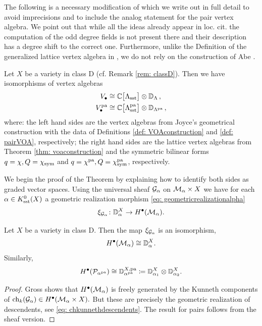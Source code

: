 \documentclass[a4paper, 12pt]{amsart}
\begin{document}
The following is a necessary modification of \cite[Theorem 5.7]{Gr19} which we write out in full detail to avoid imprecisions and to include the analog statement for the pair vertex algebra. We point out that while all the ideas already appear in loc. cit. the computation of the odd degree fields is not present there and their description has a degree shift to the correct one. Furthermore, unlike the Definition of the generalized lattice vertex algebra in \cite{Gr19}, we do not rely on the construction of Abe \cite{Abe07}.

\begin{theorem}\label{thm: gross}
Let $X$ be a variety in class D (cf. Remark \ref{rem: classD}).
Then we have isomorphisms of vertex algebras
\begin{align}
\label{Eq: sheafVOA}
V_\bullet &\cong {\mathbb{C}}\big[\Lambda_{\text{sst}}\big]\otimes {\mathbb{D}}_{\Lambda}\,,\\
\label{Eq: pairVOA}
V^{\mathop{\rm pa}\nolimits}_\bullet &\cong {\mathbb{C}}\big[\Lambda^{\mathop{\rm pa}\nolimits}_{\text{sst}}\big]\otimes {\mathbb{D}}_{\Lambda^{\mathop{\rm pa}\nolimits}}\,,
\end{align}
where: the left hand sides are the vertex algebras from Joyce's geometrical construction with the data of Definitions \ref{def: VOAconstruction} and \ref{def: pairVOA}, respectively; the right hand sides are the lattice vertex algebras from Theorem \ref{thm: voaconstruction} and the symmetric bilinear forms $q=\chi, Q=\chi_{\text{sym}}$ and $q=\chi^{\mathop{\rm pa}\nolimits}, Q=\chi_{\text{sym}}^{\mathop{\rm pa}\nolimits}$, respectively.
\end{theorem}



We begin the proof of the Theorem by explaining how to identify both sides as graded vector spaces. Using the universal sheaf ${\mathcal G}_{\alpha}$ on ${\mathcal M}_{\alpha}\times X$ we have for each $\alpha\in K_{\text{sst}}^0(X)$ a geometric realization morphism \eqref{eq: geometricrealizationalpha}
\[\xi_{{\mathcal G}_\alpha}\colon {\mathbb{D}}^X_\alpha\to H^\bullet({\mathcal M}_\alpha).\]
 
\begin{lemma}[{\cite[Theorem 4.15]{Gr19}}]
\label{Lem: isomorphism}
Let $X$ be a variety in class D. Then the map $\xi_{{\mathcal G}_{\alpha}}$ is an isomorphism, 
\[H^\bullet({\mathcal M}_\alpha)\cong {\mathbb{D}}^X_\alpha.\]
Similarly,
\[H^\bullet({\mathcal P}_{\alpha^{\mathop{\rm pa}\nolimits}})\cong {\mathbb{D}}^{X, \mathop{\rm pa}\nolimits}_{\alpha^{\mathop{\rm pa}\nolimits}}\coloneqq {\mathbb{D}}^X_{\alpha_1}\otimes {\mathbb{D}}^X_{\alpha_2}.\]
\end{lemma}
\begin{proof}
Gross shows that $H^\bullet({\mathcal M}_\alpha)$ is freely generated by the Kunneth components of $\mathrm{ch}_k({\mathcal G}_\alpha)\in H^\bullet({\mathcal M}_\alpha\times X).$ But these are precisely the geometric realization of descendents, see \eqref{eq: chkunnethdescendents}. The result for pairs follows from the sheaf version.\qedhere
\end{proof}
\end{document}

